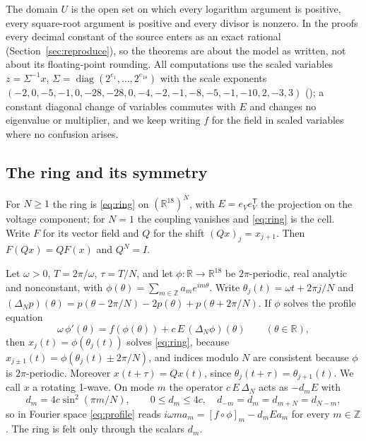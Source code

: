 \documentclass[11pt]{article}
\theoremstyle{definition}
\newcommand{\R}{\mathbb{R}}
\newcommand{\Z}{\mathbb{Z}}
\begin{document}
The domain $U$ is the open set on which every logarithm argument is positive, every square-root argument is positive and every divisor is nonzero. In the proofs every decimal constant of the source enters as an exact rational (Section~\ref{sec:reproduce}), so the theorems are about the model as written, not about its floating-point rounding. All computations use the scaled variables $z = \Sigma^{-1} x$, $\Sigma = \operatorname{diag}(2^{e_1}, \dots, 2^{e_{18}})$ with the scale exponents $(-2, 0, -5, -1, 0, -28, -28, 0, -4, -2, -1, -8, -5, -1, -10, 2, -3, 3)$ (); a constant diagonal change of variables commutes with $E$ and changes no eigenvalue or multiplier, and we keep writing $f$ for the field in scaled variables where no confusion arises.

\subsection{The ring and its symmetry}\label{sec:ringsym}

For $N \ge 1$ the ring is \eqref{eq:ring} on $(\R^{18})^N$, with $E = e_V e_V^{\mathsf T}$ the projection on the voltage component; for $N = 1$ the coupling vanishes and \eqref{eq:ring} is the cell. Write $F$ for its vector field and $Q$ for the shift $(Qx)_j = x_{j+1}$. Then $F(Qx) = QF(x)$ and $Q^N = I$.

Let $\omega > 0$, $T = 2\pi/\omega$, $\tau = T/N$, and let $\phi: \R \to \R^{18}$ be $2\pi$-periodic, real analytic and nonconstant, with $\phi(\theta) = \sum_{m \in \Z} a_m e^{im\theta}$. Write $\theta_j(t) = \omega t + 2\pi j/N$ and $(\Delta_N p)(\theta) = p(\theta - 2\pi/N) - 2p(\theta) + p(\theta + 2\pi/N)$. If $\phi$ solves the profile equation
\begin{equation}\label{eq:profile}
  \omega\,\phi'(\theta) = f(\phi(\theta)) + c\,E\,(\Delta_N\phi)(\theta) \qquad (\theta \in \R),
\end{equation}
then $x_j(t) = \phi(\theta_j(t))$ solves \eqref{eq:ring}, because $x_{j\pm1}(t) = \phi(\theta_j(t) \pm 2\pi/N)$, and indices modulo $N$ are consistent because $\phi$ is $2\pi$-periodic. Moreover $x(t + \tau) = Qx(t)$, since $\theta_j(t + \tau) = \theta_{j+1}(t)$. We call $x$ a rotating 1-wave. On mode $m$ the operator $c\,E\,\Delta_N$ acts as $-d_m E$ with
\begin{equation}\label{eq:damping}
  d_m = 4c\sin^2(\pi m/N), \qquad 0 \le d_m \le 4c, \quad d_{-m} = d_m = d_{m+N} = d_{N-m},
\end{equation}
so in Fourier space \eqref{eq:profile} reads $i\omega m a_m = [f \circ \phi]_m - d_m E a_m$ for every $m \in \Z$. The ring is felt only through the scalars $d_m$.
\end{document}
